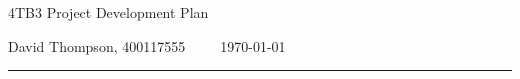 \documentclass{article}
\author{Rohit Sailey, David Thompson, Raymond Tu}
\date{\today}
\title{\mytitle}
\newcommand{\mytitle}{4TB3 Project Development Plan}
\begin{document}
{\sffamily
{\huge \mytitle}

\medskip

David Thompson, 400117555~~~~~\today
}

\par\noindent\rule{\textwidth}{0.4pt}
\bigskip
\end{document}
